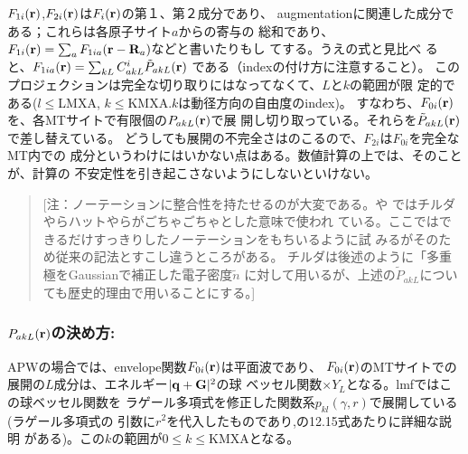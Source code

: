 \documentclass[a4paper,10pt,aip,onecolumn,amsmath,amssymb,floatfix,rmp]{revtex4-1}
\newcommand{\bfq}{{\bf q}}
\newcommand{\bfr}{{\bf r}}
\newcommand{\bfG}{{\bf G}}
\newcommand{\bfR}{{\bf R}}
\begin{document}
$F_{1i}(\bfr)$,$F_{2i}(\bfr)$は$F_i(\bfr)$の第１、第２成分であり、
augmentationに関連した成分である；これらは各原子サイト$a$からの寄与の
総和であり、$F_{1i}(\bfr)=\sum_a F_{1ia}(\bfr-\bfR_a)$などと書いたりもし
てする。うえの式と見比べ
ると、$F_{1ia}(\bfr)=\sum_{kL} C^{i}_{akL} \tilde{P}_{akL}(\bfr)$
である（indexの付け方に注意すること）。
このプロジェクションは完全な切り取りにはなってなくて、$L$と$k$の範囲が限
定的である($l\le$LMXA, $k\le$KMXA.$k$は動径方向の自由度のindex)。
すなわち、$F_{0i}(\bfr)$を、各MTサイトで有限個の${P}_{akL} (\bfr)$で展
開し切り取っている。それらを$\tilde{P}_{akL}(\bfr)$で差し替えている。
どうしても展開の不完全さはのこるので、$F_{2i}$は$F_{0i}$を完全なMT内での
成分というわけにはいかない点はある。数値計算の上では、そのことが、計算の
不安定性を引き起こさないようにしないといけない。

\begin{quote}
[注：ノーテーションに整合性を持たせるのが大変である。\cite{PAW}や
\cite{kresse99}ではチルダやらハットやらがごちゃごちゃとした意味で使われ
ている。ここではできるだけすっきりしたノーテーションをもちいるように試
みるがそのため従来の記法とすこし違うところがある。
チルダは後述のように「多重極をGaussianで補正した電子密度$\tilde{n}$
に対して用いるが、上述の$\tilde{P}_{akL}$についても歴史的理由で用いることにする。]
\end{quote}


\subsubsection{\bf ${P}_{akL}(\bfr)$の決め方:}
APWの場合\cite{soler89}では、envelope関数$F_{0i}(\bfr)$は平面波であり、
$F_{0i}(\bfr)$のMTサイトでの展開の$L$成分は、エネルギー$|\bfq+\bfG|^2$の球
ベッセル関数$\times Y_L$となる。lmfではこの球ベッセル関数を
ラゲール多項式を修正した関数系$p_{kl}(\gamma,r)$で展開している(ラゲール多項式の
引数に$r^2$を代入したものであり,\cite{Bott98}の12.15式あたりに詳細な説明
がある)。この$k$の範囲が$0\le k \le$KMXAとなる。
\end{document}
